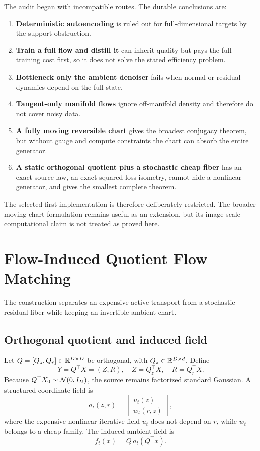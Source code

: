 The audit began with incompatible routes.  The durable conclusions are:
\begin{enumerate}[leftmargin=*]
\item \textbf{Deterministic autoencoding} is ruled out for full-dimensional targets by the support obstruction.
\item \textbf{Train a full flow and distill it} can inherit quality but pays the full training cost first, so it does not solve the stated efficiency problem.
\item \textbf{Bottleneck only the ambient denoiser} fails when normal or residual dynamics depend on the full state.
\item \textbf{Tangent-only manifold flows} ignore off-manifold density and therefore do not cover noisy data.
\item \textbf{A fully moving reversible chart} gives the broadest conjugacy theorem, but without gauge and compute constraints the chart can absorb the entire generator.
\item \textbf{A static orthogonal quotient plus a stochastic cheap fiber} has an exact source law, an exact squared-loss isometry, cannot hide a nonlinear generator, and gives the smallest complete theorem.
\end{enumerate}
The selected first implementation is therefore deliberately restricted.  The broader moving-chart formulation remains useful as an extension, but its image-scale computational claim is not treated as proved here.

\section{Flow-Induced Quotient Flow Matching}

The construction separates an expensive active transport from a stochastic residual fiber while keeping an invertible ambient chart.

\subsection{Orthogonal quotient and induced field}

Let $Q=[Q_z,Q_r]\in\mathbb R^{D\times D}$ be orthogonal, with $Q_z\in\mathbb R^{D\times d}$.  Define
\begin{equation}
  Y=Q^\top X=(Z,R),\quad Z=Q_z^\top X,\quad R=Q_r^\top X.
\end{equation}
Because $Q^\top X_0\sim\mathcal N(0,I_D)$, the source remains factorized standard Gaussian.  A structured coordinate field is
\begin{equation}
 a_t(z,r)=
 \begin{bmatrix}
 u_t(z)\\ w_t(r,z)
 \end{bmatrix},
 \label{eq:triangular-field}
\end{equation}
where the expensive nonlinear iterative field $u_t$ does not depend on $r$, while $w_t$ belongs to a cheap family.  The induced ambient field is
\begin{equation}
 f_t(x)=Q\,a_t(Q^\top x).
\end{equation}

